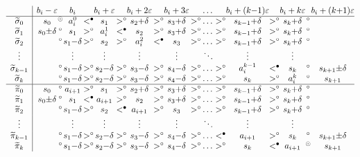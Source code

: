 \documentclass[11pt]{amsart}
\newcommand\wt{\widetilde}
\newcommand\eps{\varepsilon}
\newcommand\sigm{\wt\sigma}
\newcommand\pim{\wt\pi}
\begin{document}
\begin{table}[htb]
$$\begin{array}{c|c@{}c@{}c@{\,}l@{}c@{\,}l@{}c@{\,}l@{}c@{\,}l@{\,}c@{\,}l@{}c@{}l@{}c@{}c@{}c@{}}
& b_i-\eps && b_i &&b_i+\eps &&b_i+2\eps &&b_i+3\eps && \dots &&b_i+(k{-}1)\eps &&b_i+k\eps &&b_i+(k{+}1)\eps \\ \hline
\sigm_0 & s_0 & ^{\odot} & a_i^0 & <^\bullet & s_1 &>^\circ& s_2{+}\delta &>^\circ& s_3{+}\delta &>^\circ& \dots &>^\circ&  s_{k-1}{+}\delta &>^\circ& s_k{+}\delta &^\circ&  \\
\sigm_1 & s_0{\pm}\delta & ^\circ & s_1 & >^\circ & a_i^1 &<^\bullet& s_2 &>^\circ& s_3{+}\delta &>^\circ& \dots &>^\circ&  s_{k-1}{+}\delta &>^\circ& s_k{+}\delta &^\circ&  \\
\sigm_2 &  & ^\circ & s_1{-}\delta & >^\circ & s_2 &>^\circ& a_i^2 &<^\bullet& s_3 &>^\circ& \dots &>^\circ&  s_{k-1}{+}\delta &>^\circ& s_k{+}\delta &^\circ&  \\
\vdots & &&\vdots&&\vdots&&\vdots&&\vdots&& \ddots &&\vdots&&\vdots&&\\
\sigm_{k-1} &  & ^\circ & s_1{-}\delta & >^\circ & s_2{-}\delta &>^\circ& s_3{-}\delta &>^\circ& s_4{-}\delta &>^\circ& \dots &>^\circ&  a_i^{k-1} &<^\bullet& s_k &^\circ& s_{k+1}{\pm}\delta \\
\sigm_{k} &  & ^\circ & s_1{-}\delta & >^\circ & s_2{-}\delta &>^\circ& s_3{-}\delta &>^\circ& s_4{-}\delta &>^\circ& \dots &>^\circ& s_k &>^\circ& a_i^{k} &^\circ & s_{k+1} \\ \hline
\pim_0 & s_0 & ^\circ & a_{i+1} & >^\circ & s_1 &>^\circ& s_2{+}\delta &>^\circ& s_3{+}\delta &>^\circ& \dots &>^\circ&  s_{k-1}{+}\delta &>^\circ& s_k{+}\delta &^\circ&  \\
\pim_1 & s_0{\pm}\delta & ^\circ & s_1 & <^\bullet & a_{i+1} &>^\circ& s_2 &>^\circ& s_3{+}\delta &>^\circ& \dots &>^\circ&  s_{k-1}{+}\delta &>^\circ& s_k{+}\delta &^\circ&  \\
\pim_2 &  & ^\circ & s_1{-}\delta & >^\circ & s_2 &<^\bullet& a_{i+1} &>^\circ& s_3 &>^\circ& \dots &>^\circ&  s_{k-1}{+}\delta &>^\circ& s_k{+}\delta &^\circ&  \\
\vdots & &&\vdots&&\vdots&&\vdots&&\vdots&& \ddots &&\vdots&&\vdots&&\\
\pim_{k-1} &  & ^\circ & s_1{-}\delta & >^\circ & s_2{-}\delta &>^\circ& s_3{-}\delta &>^\circ& s_4{-}\delta &>^\circ& \dots &<^\bullet&  a_{i+1} &>^\circ& s_k &^\circ& s_{k+1}{\pm}\delta \\
\pim_{k} &  & ^\circ & s_1{-}\delta & >^\circ & s_2{-}\delta &>^\circ& s_3{-}\delta &>^\circ& s_4{-}\delta &>^\circ& \dots &>^\circ& s_k &<^\bullet& a_{i+1} & ^{\odot} & s_{k+1}
\end{array}
$$
\caption{The values $\sigm_j(b_i+\ell\eps)$ and $\pim_j(b_i+\ell\eps)$ for $0\le j\le k$ and $-1\le \ell\le k+1$. The relative order of adjacent entries is indicated,
as well as whether it agrees or not with the relative order of the corresponding entries in $\sigma$ and $\pi$.\label{tab:sigmpim}}
\end{table}
\end{document}
